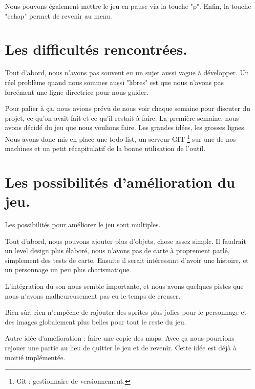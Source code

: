 Nous pouvons également mettre le jeu en pause via la touche "p".
Enfin, la touche "echap" permet de revenir au menu.

\section{Les difficultés rencontrées.}

Tout d'abord, nous n'avons pas souvent eu un sujet aussi vague à développer.
Un réel problème quand nous sommes aussi "libres" est que nous n'avons pas forcément une ligne directrice pour nous guider.

Pour palier à ça, nous avions prévu de nous voir chaque semaine pour discuter du projet, ce qu'on avait fait et ce qu'il restait à faire.
La première semaine, nous avons décidé du jeu que nous voulions faire.
Les grandes idées, les grosses lignes.
Nous avons donc mis en place une todo-list, un serveur \cite{GIT} GIT \protect\footnote{Git : gestionnaire de versionnement. } sur une de nos machines et un petit récapitulatif de la bonne utilisation de l'outil.


\section{Les possibilités d'amélioration du jeu.}

Les possibilités pour améliorer le jeu sont multiples.

Tout d'abord, nous pouvons ajouter plus d'objets, chose assez simple.
Il faudrait un level design plus élaboré, nous n'avons pas de carte à proprement parlé, simplement des tests de carte.
Ensuite il serait intéressant d'avoir une histoire, et un personnage un peu plus charismatique.

L'intégration du son nous semble importante, et nous avons quelques pistes que nous n'avons malheureusement pas eu le temps de creuser.

Bien sûr, rien n'empêche de rajouter des sprites plus jolies pour le personnage et des images globalement plus belles pour tout le reste du jeu.


Autre idée d'amélioration : faire une copie des maps.
Avec ça nous pourrions rejouer une partie au lieu de quitter le jeu et de revenir.
Cette idée est déjà à moitié implémentée.

\clearpage
